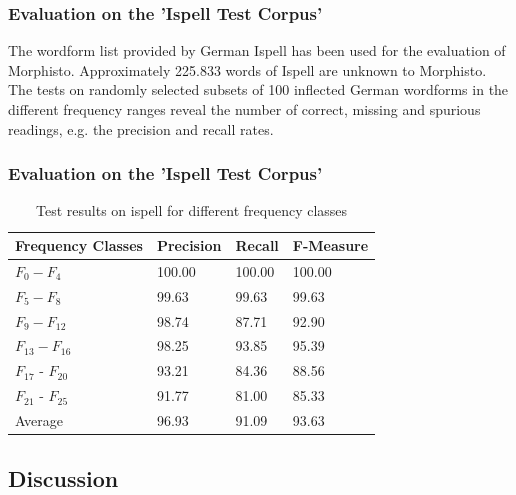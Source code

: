 \documentclass {beamer}
\begin{document}
\frame
{
\frametitle{Evaluation on the 'Ispell Test Corpus'}
The wordform list provided by German Ispell has been used for the evaluation of Morphisto. 
Approximately 225.833 words 
of Ispell are unknown to Morphisto. 
The tests on randomly selected subsets of 100 inflected German wordforms in the different frequency ranges reveal the number of correct, missing and spurious readings, e.g. the precision and recall rates.  
}

\frame
{
\frametitle{Evaluation on the 'Ispell Test Corpus'} 

\smallskip
\begin{table}[h] 
\begin{center}
	\begin{tabular}{ | p{} |  p{} | p{} | p{} |}
	\hline
\textbf{Frequency Classes} &  \textbf{Precision} & \textbf{Recall} & \textbf{F-Measure} \\
\hline
$F_{0} - F_{4}$ &  100.00 & 100.00 & 100.00 \\
\hline
$F_{5} - F_{8}$ &  99.63 & 99.63 & 99.63 \\
\hline
$F_{9} - F_{12}$ &  98.74 & 87.71 & 92.90 \\
\hline
$F_{13} - F_{16}$ & 98.25 & 93.85  & 95.39 \\
\hline
$F_{17}$ - $F_{20}$&  93.21 & 84.36 & 88.56 \\
\hline
$F_{21}$ - $F_{25}$  & 91.77 & 81.00 & 85.33 \\
\hline
\hline
Average &   96.93 & 91.09 & 93.63\\
\hline
\end{tabular}	
\caption{Test results on ispell for different frequency classes}
\end{center}
\end{table} 
\smallskip
}

\subsection{Discussion}

\end{document}
